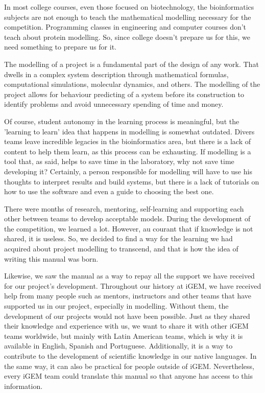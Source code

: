 \documentclass[11pt, letterpaper, english]{article}
\begin{document}
\par In most college courses, even those focused on biotechnology, the bioinformatics subjects are not enough to teach the mathematical modelling necessary for the competition. Programming classes in engineering and computer courses don't teach about protein modelling. So, since college doesn't prepare us for this, we need something to prepare us for it.

\par{The modelling of a project is a fundamental part of the design of any work. That dwells in a complex system description through mathematical formulas, computational simulations, molecular dynamics, and others. The modelling of the project allows for behaviour predicting of a system before its construction to identify problems and avoid unnecessary spending of time and money.}

\par {Of course, student autonomy in the learning process is meaningful, but the 'learning to learn' idea that happens in modelling is somewhat outdated. Divers teams leave incredible legacies in the bioinformatics area, but there is a lack of content to help them learn, as this process can be exhausting. If modelling is a tool that, as said, helps to save time in the laboratory, why not save time developing it? Certainly, a person responsible for modelling will have to use his thoughts to interpret results and build systems, but there is a lack of tutorials on how to use the software and even a guide to choosing the best one.}

\par{There were months of research, mentoring, self-learning and supporting each other between teams to develop acceptable models. During the development of the competition, we learned a lot. However, au courant that if knowledge is not shared, it is useless. So, we decided to find a way for the learning we had acquired about project modelling to transcend, and that is how the idea of writing this manual was born.} 

\par{Likewise, we saw the manual as a way to repay all the support we have received for our project's development. Throughout our history at iGEM, we have received help from many people such as mentors, instructors and other teams that have supported us in our project, especially in modelling. Without them, the development of our projects would not have been possible. Just as they shared their knowledge and experience with us, we want to share it with other iGEM teams worldwide, but mainly with Latin American teams, which is why it is available in English, Spanish and Portuguese. Additionally, it is a way to contribute to the development of scientific knowledge in our native languages. In the same way, it can also be practical for people outside of iGEM. Nevertheless, every iGEM team could translate this manual so that anyone has access to this information.} 
\end{document}
